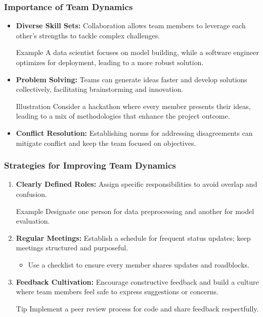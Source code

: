 \documentclass[aspectratio=169]{beamer}
\begin{document}
\begin{frame}[fragile]
    \frametitle{Importance of Team Dynamics}
    \begin{itemize}
        \item \textbf{Diverse Skill Sets:} 
        Collaboration allows team members to leverage each other's strengths to tackle complex challenges.
        \begin{block}{Example}
            A data scientist focuses on model building, while a software engineer optimizes for deployment, leading to a more robust solution.
        \end{block}
        
        \item \textbf{Problem Solving:} 
        Teams can generate ideas faster and develop solutions collectively, facilitating brainstorming and innovation.
        \begin{block}{Illustration}
            Consider a hackathon where every member presents their ideas, leading to a mix of methodologies that enhance the project outcome.
        \end{block}
        
        \item \textbf{Conflict Resolution:} 
        Establishing norms for addressing disagreements can mitigate conflict and keep the team focused on objectives.
    \end{itemize}
\end{frame}

\begin{frame}[fragile]
    \frametitle{Strategies for Improving Team Dynamics}
    \begin{enumerate}
        \item \textbf{Clearly Defined Roles:} Assign specific responsibilities to avoid overlap and confusion.
        \begin{block}{Example}
            Designate one person for data preprocessing and another for model evaluation.
        \end{block}
        
        \item \textbf{Regular Meetings:} Establish a schedule for frequent status updates; keep meetings structured and purposeful.
        \begin{itemize}
            \item Use a checklist to ensure every member shares updates and roadblocks.
        \end{itemize}
        
        \item \textbf{Feedback Cultivation:} Encourage constructive feedback and build a culture where team members feel safe to express suggestions or concerns.
        \begin{block}{Tip}
            Implement a peer review process for code and share feedback respectfully.
        \end{block}
    \end{enumerate}
\end{frame}
\end{document}
